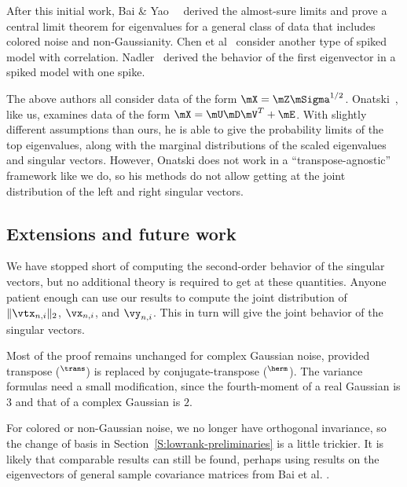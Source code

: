 After this initial work, Bai \& Yao~\cite{bai2008clt}~\cite{bai2008lts} derived the almost-sure limits and prove a central limit theorem for eigenvalues for a general class of data that includes colored noise and non-Gaussianity.  Chen et al~\cite{chen2009ppc} consider another type of spiked model with correlation.  Nadler~\cite{nadler2008fsa} derived the behavior of the first eigenvector in a spiked model with one spike.

The above authors all consider data of the form $\mX = \mZ \mSigma^{1/2}$.
Onatski~\cite{onatski2009}, like us, examines data of the form 
$\mX = \mU \mD \mV^T + \mE$.  With slightly different assumptions than ours, he is able to give the probability limits of the top eigenvalues, along with the marginal distributions of the scaled eigenvalues and singular vectors.  However, Onatski does not work in a ``transpose-agnostic'' framework like we do, so his methods do not allow getting at the joint distribution of the left and right singular vectors.

\subsection{Extensions and future work}

We have stopped short of computing the second-order behavior of the singular vectors, but no additional theory is required to get at these quantities.  Anyone patient enough can use our results to compute the joint distribution of 
$\| \vtx_{n,i} \|_2$, $\vx_{n,i}$, and $\vy_{n,i}$.  This in turn will give the joint behavior of the singular vectors.  

Most of the proof remains unchanged for complex Gaussian noise, provided
transpose ($^\trans$) is replaced by conjugate-transpose ($^\herm$).  The
variance formulas need a small modification, since the fourth-moment of
a real Gaussian is $3$ and that of a complex Gaussian is $2$.

For colored or non-Gaussian noise, we no longer have orthogonal invariance, so the change of basis in Section~\ref{S:lowrank-preliminaries} is a little trickier.  It is likely that comparable results can still be found, perhaps using results on the eigenvectors of general sample covariance matrices from Bai et al. \cite{bai2007ael}.

